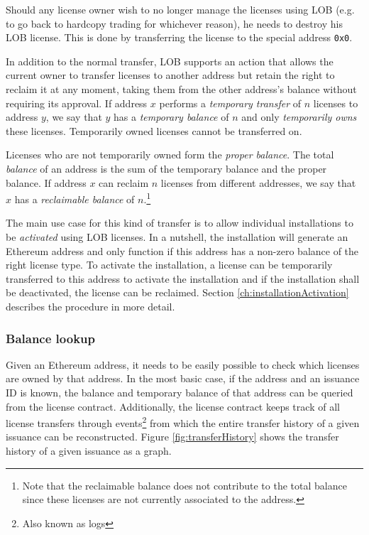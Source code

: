 \documentclass[a4paper]{article}
\begin{document}
Should any license owner wish to no longer manage the licenses using LOB (e.g. to go back to hardcopy trading for whichever reason), he needs to destroy his LOB license. This is done by transferring the license to the special address \texttt{0x0}.

In addition to the normal transfer, LOB supports an action that allows the current owner to transfer licenses to another address but retain the right to reclaim it at any moment, taking them from the other address's balance without requiring its approval. If address $x$ performs a \emph{temporary transfer} of $n$ licenses to address $y$, we say that $y$ has a \emph{temporary balance} of $n$ and only \emph{temporarily owns} these licenses. Temporarily owned licenses cannot be transferred on.

Licenses who are not temporarily owned form the \emph{proper balance}. The total \emph{balance} of an address is the sum of the temporary balance and the proper balance. If address $x$ can reclaim $n$ licenses from different addresses, we say that $x$ has a \emph{reclaimable balance} of $n$.\footnote{Note that the reclaimable balance does not contribute to the total balance since these licenses are not currently associated to the address.}

The main use case for this kind of transfer is to allow individual installations to be \emph{activated} using LOB licenses. In a nutshell, the installation will generate an Ethereum address and only function if this address has a non-zero balance of the right license type. To activate the installation, a license can be temporarily transferred to this address to activate the installation and if the installation shall be deactivated, the license can be reclaimed. Section \ref{ch:installationActivation} describes the procedure in more detail.





\subsubsection{Balance lookup}
\label{ch:licenseContractBalanceLookup}

Given an Ethereum address, it needs to be easily possible to check which licenses are owned by that address. In the most basic case, if the address and an issuance ID is known, the balance and temporary balance of that address can be queried from the license contract. Additionally, the license contract keeps track of all license transfers through events\footnote{Also known as logs} from which the entire transfer history of a given issuance can be reconstructed. Figure \ref{fig:transferHistory} shows the transfer history of a given issuance as a graph.
\end{document}
